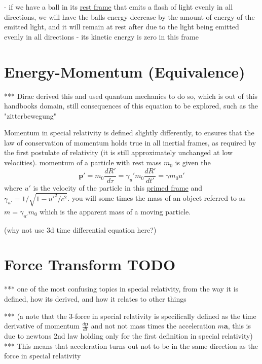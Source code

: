 - if we have a ball in its \hyperlink{def-proper-frame}{rest frame} that emits a flash of light evenly in all directions, we will have the balls energy decrease by the amount of energy of the emitted light, and it will remain at rest after due to the light being emitted evenly in all directions
- its kinetic energy is zero in this frame

\section{Energy-Momentum (Equivalence)}

*** Dirac derived this and used quantum mechanics to do so, which is out of this handbooks domain, still consequences of this equation to be explored, such as the "zitterbewegung"

Momentum in special relativity is defined slightly differently, to ensures that the law of conservation of momentum holds true in all inertial frames, as required by the first postulate of relativity (it is still approximately unchanged at low velocities). momentum of a particle with rest mass $m_0$ is given the 
\begin{equation}%
    \mathbf{p'} = m_0 \frac{dR'}{d\tau}= \gamma_u' m_0 \frac{dR'}{dt'} = \gamma m_0 u'
\end{equation}%
where $u'$ is the velocity of the particle in this \hyperlink{def-Primed-Frame}{primed frame} and $\gamma_{u'}= 1/\sqrt{1-u'^2/c^2}$. you will some times the mass of an object referred to as $m=\gamma_{u'} m_0$ which is the apparent mass of a moving particle.

(why not use 3d time differential equation here?)

\section{Force Transform TODO}

*** one of the most confusing topics in special relativity, from the way it is defined, how its derived, and how it relates to other things\newline

*** (a note that the 3-force in special relativity is specifically defined as the time derivative of momentum $\frac{d\mathbf{p}}{dt}$ and not not mass times the acceleration $m\mathbf{a}$, this is due to newtons 2nd law holding only for the first definition in special relativity) \newline
*** This means that acceleration turns out not to be in the same direction as the force in special relativity\newline

